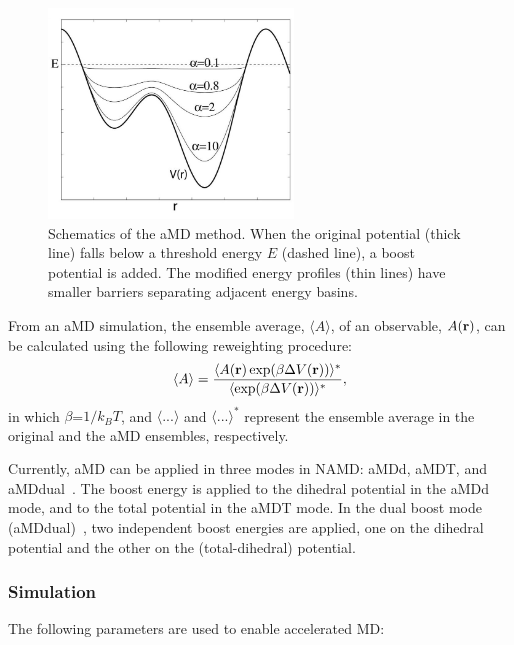 \begin{figure}[!ht]
  \centering
  \includegraphics[width=6.5cm]{figures/amd_schematic.jpg}
  \caption{Schematics of the aMD method. When the original potential (thick line) falls below a threshold energy $E$ (dashed line),
          a boost potential is added. The modified energy profiles (thin lines) have smaller barriers separating adjacent
	  energy basins. 
	  }
  \label{fig:amd_schematic}
\end{figure}
From an aMD simulation, the ensemble average, $\langle A \rangle$, of an observable, $A({\bf r})$, can be calculated
using the following reweighting procedure:
\begin{equation}
\langle A \rangle =\frac{\langle A({\bf r})\,\text{exp} (\beta \Delta V({\bf r})) \rangle^* }
{\langle \text{exp}  (\beta \Delta V({\bf r})) \rangle^*},
\end{equation}
in which $\beta$=$1/k_BT$, and $\langle ... \rangle$ and $\langle...\rangle^*$ represent 
the ensemble average in the original and the aMD ensembles, respectively. 

Currently, aMD can be applied in three modes in NAMD: aMDd, aMDT, and aMDdual~\cite{WANG2011mc}. The boost energy
is applied to the dihedral potential in the aMDd mode, and to the total potential in the aMDT mode.
In the dual boost mode (aMDdual)~\cite{HAME2007mc}, two independent boost energies are applied, one on the dihedral potential and the other
on the (total-dihedral) potential.

\subsubsection{Simulation}

The following parameters are used to enable accelerated MD:

